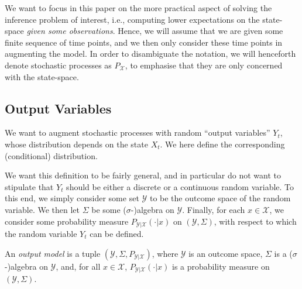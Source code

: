 \documentclass[twoside,11pt]{article}
\newcommand{\states}{\mathcal{X}}
\newcommand{\observs}{\mathcal{Y}}
\begin{document}
We want to focus in this paper on the more practical aspect of solving the inference problem of interest, i.e., computing lower expectations on the state-space \emph{given some observations}. %
Hence, we will assume that we are given some finite sequence of time points, and we then only consider these time points in augmenting the model.
In order to disambiguate the notation, we will henceforth denote stochastic processes as $P_\states$, to emphasise that they are only concerned with the state-space. %

\subsection{Output Variables}\label{sec:observs}

We want to augment stochastic processes with random ``output variables'' $Y_t$, whose distribution depends on the state $X_t$. We here define the corresponding (conditional) distribution.

We want this definition to be fairly general, and in particular do not want to stipulate that $Y_t$ should be either a discrete or a continuous random variable. To this end, we simply consider some set $\observs$ to be the outcome space of the random variable. We then let $\Sigma$ be some ($\sigma$-)algebra on $\observs$. Finally, for each $x\in\states$, we consider some probability measure $P_{\observs\vert\states}(\cdot\vert x)$ on $(\observs,\Sigma)$, with respect to which the random variable $Y_t$ can be defined.

\begin{definition}
An \emph{output model} is a tuple $(\observs,\Sigma,P_{\observs\vert \states})$, where $\observs$ is an outcome space, $\Sigma$ is a ($\sigma$-)algebra on $\observs$, and, for all $x\in\states$, $P_{\observs\vert\states}(\cdot\vert x)$ is a probability measure on $(\observs,\Sigma)$.
\end{definition}
\end{document}
